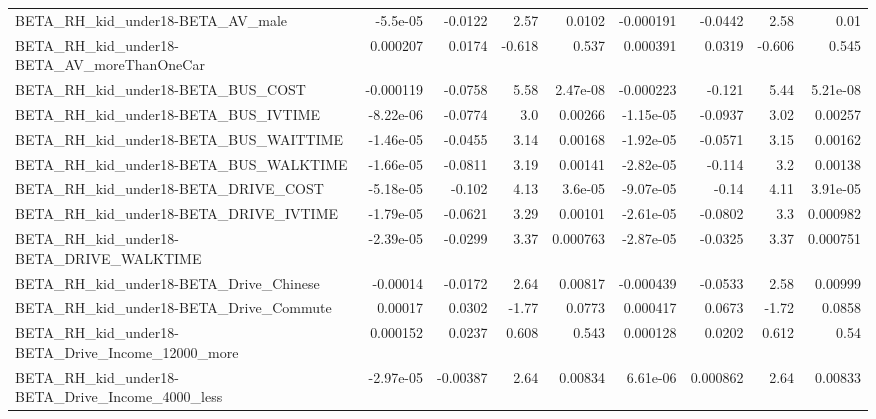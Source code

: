 \begin{tabular}{lrrrrrrrr}
BETA\_RH\_kid\_under18-BETA\_AV\_male                   &    -5.5e-05 &      -0.0122 &      2.57 &   0.0102 &  -0.000191 &     -0.0442 &         2.58 &          0.01 \\
BETA\_RH\_kid\_under18-BETA\_AV\_moreThanOneCar         &    0.000207 &       0.0174 &    -0.618 &    0.537 &   0.000391 &      0.0319 &       -0.606 &         0.545 \\
BETA\_RH\_kid\_under18-BETA\_BUS\_COST                  &   -0.000119 &      -0.0758 &      5.58 & 2.47e-08 &  -0.000223 &      -0.121 &         5.44 &      5.21e-08 \\
BETA\_RH\_kid\_under18-BETA\_BUS\_IVTIME                &   -8.22e-06 &      -0.0774 &       3.0 &  0.00266 &  -1.15e-05 &     -0.0937 &         3.02 &       0.00257 \\
BETA\_RH\_kid\_under18-BETA\_BUS\_WAITTIME              &   -1.46e-05 &      -0.0455 &      3.14 &  0.00168 &  -1.92e-05 &     -0.0571 &         3.15 &       0.00162 \\
BETA\_RH\_kid\_under18-BETA\_BUS\_WALKTIME              &   -1.66e-05 &      -0.0811 &      3.19 &  0.00141 &  -2.82e-05 &      -0.114 &          3.2 &       0.00138 \\
BETA\_RH\_kid\_under18-BETA\_DRIVE\_COST                &   -5.18e-05 &       -0.102 &      4.13 &  3.6e-05 &  -9.07e-05 &       -0.14 &         4.11 &      3.91e-05 \\
BETA\_RH\_kid\_under18-BETA\_DRIVE\_IVTIME              &   -1.79e-05 &      -0.0621 &      3.29 &  0.00101 &  -2.61e-05 &     -0.0802 &          3.3 &      0.000982 \\
BETA\_RH\_kid\_under18-BETA\_DRIVE\_WALKTIME            &   -2.39e-05 &      -0.0299 &      3.37 & 0.000763 &  -2.87e-05 &     -0.0325 &         3.37 &      0.000751 \\
BETA\_RH\_kid\_under18-BETA\_Drive\_Chinese             &    -0.00014 &      -0.0172 &      2.64 &  0.00817 &  -0.000439 &     -0.0533 &         2.58 &       0.00999 \\
BETA\_RH\_kid\_under18-BETA\_Drive\_Commute             &     0.00017 &       0.0302 &     -1.77 &   0.0773 &   0.000417 &      0.0673 &        -1.72 &        0.0858 \\
BETA\_RH\_kid\_under18-BETA\_Drive\_Income\_12000\_more   &    0.000152 &       0.0237 &     0.608 &    0.543 &   0.000128 &      0.0202 &        0.612 &          0.54 \\
BETA\_RH\_kid\_under18-BETA\_Drive\_Income\_4000\_less    &   -2.97e-05 &     -0.00387 &      2.64 &  0.00834 &   6.61e-06 &    0.000862 &         2.64 &       0.00833 \\

\end{tabular}
